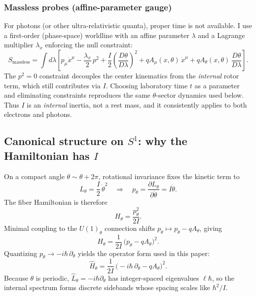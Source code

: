 \subsubsection{Massless probes (affine-parameter gauge)}
For photons (or other ultra-relativistic quanta), proper time is not available. I use a
first-order (phase-space) worldline with an affine parameter $\lambda$ and a Lagrange
multiplier $\lambda_x$ enforcing the null constraint:
\begin{equation}
S_\text{massless}=\int d\lambda\left[
 p_\mu \dot x^\mu - \frac{\lambda_x}{2}\,p^2
 + \frac{I}{2}\left(\frac{D\theta}{D\lambda}\right)^2
 + q A_\mu(x,\theta)\,\dot x^\mu
 + q A_\theta(x,\theta)\,\frac{D\theta}{D\lambda}
\right].
\label{eq:Smassless}
\end{equation}
The $p^2=0$ constraint decouples the center kinematics from the \emph{internal} rotor term,
which still contributes via $I$. Choosing laboratory time $t$ as a parameter and eliminating
constraints reproduces the same $\theta$-sector dynamics used below. Thus $I$ is an \emph{internal}
inertia, not a rest mass, and it consistently applies to both electrons and photons.

\subsection{Canonical structure on $S^1$: why the Hamiltonian has $I$}
On a compact angle $\theta\sim\theta+2\pi$, rotational invariance fixes the kinetic term to
\begin{equation}
L_\theta=\frac{I}{2}\,\dot\theta^2 \quad\Longrightarrow\quad p_\theta=\frac{\partial L_\theta}{\partial \dot\theta}=I\dot\theta.
\end{equation}
The fiber Hamiltonian is therefore
\begin{equation}
H_\theta=\frac{p_\theta^2}{2I}.
\end{equation}
Minimal coupling to the $U(1)_\theta$ connection shifts $p_\theta\mapsto p_\theta-qA_\theta$, giving
\begin{equation}
H_\theta=\frac{1}{2I}\,\big(p_\theta-qA_\theta\big)^2.
\end{equation}
Quantizing $p_\theta\to -i\hbar\,\partial_\theta$ yields the operator form used in this paper:
\begin{equation}
\hat H_\theta=\frac{1}{2I}\,\big(-i\hbar\,\partial_\theta-qA_\theta\big)^2.
\label{eq:Htheta_op}
\end{equation}
Because $\theta$ is periodic, $\hat L_\theta=-i\hbar\partial_\theta$ has integer-spaced eigenvalues $\ell\hbar$,
so the internal spectrum forms discrete sidebands whose spacing scales like $\hbar^2/I$.

